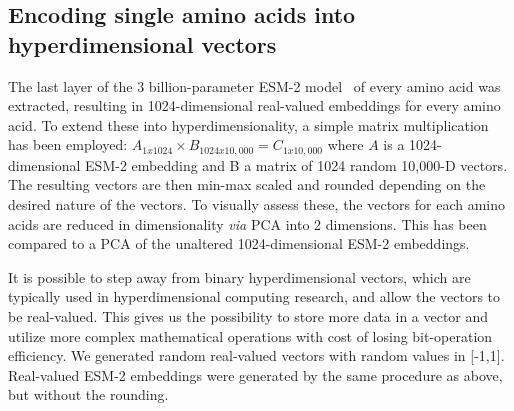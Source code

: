 \subsection*{Encoding single amino acids into hyperdimensional vectors}
The last layer of the 3 billion-parameter ESM-2 model~\cite{esm2} of every amino acid was extracted, resulting in 1024-dimensional real-valued embeddings for every amino acid. To extend these into hyperdimensionality, a simple matrix multiplication has been employed: $A_{1x1024} \times B_{1024x10,000} = C_{1x10,000}$ where $A$ is a 1024-dimensional ESM-2 embedding and B a matrix of 1024 random 10,000-D vectors. The resulting vectors are then min-max scaled and rounded depending on the desired nature of the vectors. To visually assess these, the vectors for each amino acids are reduced in dimensionality \textit{via} PCA into 2 dimensions. This has been compared to a PCA of the unaltered 1024-dimensional ESM-2 embeddings.

It is possible to step away from binary hyperdimensional vectors, which are typically used in hyperdimensional computing research, and allow the vectors to be real-valued. This gives us the possibility to store more data in a vector and utilize more complex mathematical operations with cost of losing bit-operation efficiency. We generated random real-valued vectors with random values in [-1,1]. Real-valued ESM-2 embeddings were generated by the same procedure as above, but without the rounding.

